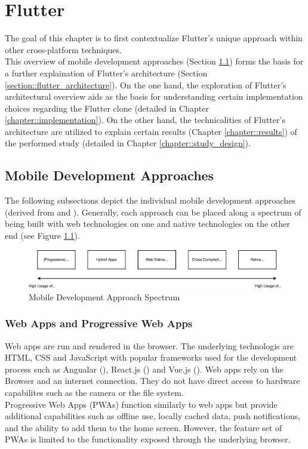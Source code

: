 \chapter{Flutter}
The goal of this chapter is to first contextualize Flutter's unique approach within other cross-platform techniques.\\
This overview of mobile development approaches (Section \ref{section::other_architectures}) forms the basis for a further explaination of Flutter's architecture (Section \ref{section::flutter_architecture}).
On the one hand, the exploration of Flutter's architectural overview aids as the basis for understanding certain implementation choices regarding the Flutter clone (detailed in Chapter \ref{chapter::implementation}).
On the other hand, the technicalities of Flutter's architecture are utilized to explain certain results (Chapter \ref{chapter::results}) of the performed study (detailed in Chapter \ref{chapter::study_design}).

\section{Mobile Development Approaches} \label{section::other_architectures}
The following subsections depict the individual mobile development approaches (derived from \cite{Heitkoetter2013} and \cite{Cunha2018}).
Generally, each approach can be placed along a spectrum of being built with web technologies on one and native technologies on the other end (see Figure \ref{fig::mobile_development_approach_spectrum}).\\
\begin{figure}
    \includegraphics[width=\linewidth]{images/architectures/mobile_development_approaches.eps}
    \caption{Mobile Development Approach Spectrum}
    \label{fig::mobile_development_approach_spectrum}
\end{figure}


\subsection{Web Apps and Progressive Web Apps} \label{subsection::web_apps}
Web apps are run and rendered in the browser. The underlying technologis are HTML, CSS and JavaScript with popular frameworks 
used for the development process such as Angualar (\cite{Angular2021}), React.js (\cite{React2021}) and Vue.js (\cite{Vue2021}). Web apps rely on the Browser and an internet connection.
They do not have direct access to hardware capabilites such as the camera or the file system.\\
Progressive Web Apps (PWAs) function similarly to web apps but provide additional capabilities such as offline use, locally cached data, 
push notifications, and the ability to add them to the home screen. However, the feature set of PWAs is limited to the functionality exposed through the underlying browser.

